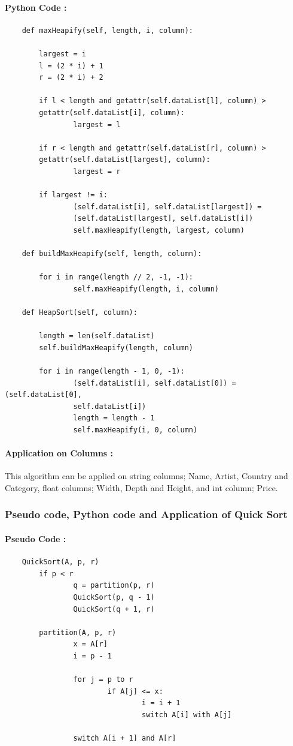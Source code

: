 \documentclass[12pt]{article}
\begin{document}
    \paragraph{Python Code :}
    \begin{verbatim}
    def maxHeapify(self, length, i, column):

        largest = i
        l = (2 * i) + 1
        r = (2 * i) + 2

        if l < length and getattr(self.dataList[l], column) >
        getattr(self.dataList[i], column):
                largest = l

        if r < length and getattr(self.dataList[r], column) >
        getattr(self.dataList[largest], column):
                largest = r

        if largest != i:
                (self.dataList[i], self.dataList[largest]) =
                (self.dataList[largest], self.dataList[i])
                self.maxHeapify(length, largest, column)

    def buildMaxHeapify(self, length, column):

        for i in range(length // 2, -1, -1):
                self.maxHeapify(length, i, column)

    def HeapSort(self, column):

        length = len(self.dataList)
        self.buildMaxHeapify(length, column)

        for i in range(length - 1, 0, -1):
                (self.dataList[i], self.dataList[0]) = (self.dataList[0],
                self.dataList[i])
                length = length - 1
                self.maxHeapify(i, 0, column)
    \end{verbatim}
    \paragraph{Application on Columns :} 
    This algorithm can be applied on string columns; Name, Artist, Country and Category, float columns; Width, Depth and Height, and int column; Price.
    
    \newpage
    \subsubsection{Pseudo code, Python code and Application of Quick Sort}
    \paragraph{Pseudo Code :}
    \begin{verbatim}
    QuickSort(A, p, r)
        if p < r
                q = partition(p, r)
                QuickSort(p, q - 1)
                QuickSort(q + 1, r)

        partition(A, p, r)
                x = A[r]
                i = p - 1
        
                for j = p to r
                        if A[j] <= x:
                                i = i + 1
                                switch A[i] with A[j]
                
                switch A[i + 1] and A[r]
    \end{verbatim}
\end{document}
